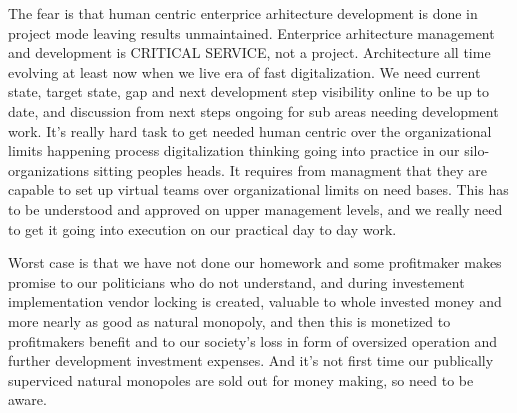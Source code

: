 The fear is that human centric enterprice arhitecture development is done in
project mode leaving results unmaintained. Enterprice arhitecture management
and development is CRITICAL SERVICE, not a project. Architecture all time
evolving at least now when we live era of fast digitalization. We need current
state, target state, gap and next development step visibility online to be up
to date, and discussion from next steps ongoing for sub areas needing
development work. It's really hard task to get needed human centric over the
organizational limits happening process digitalization thinking going into
practice in our silo-organizations sitting peoples heads. It requires from
managment that they are capable to set up virtual teams over organizational
limits on need bases. This has to be understood and approved on upper
management levels, and we really need to get it going into execution on our
practical day to day work.

Worst case is that we have not done our homework and some profitmaker makes
promise to our politicians who do not understand, and during investement
implementation vendor locking is created, valuable to whole invested money
and more nearly as good as natural monopoly, and then this is monetized to
profitmakers benefit and to our society's loss in form of oversized operation
and further development investment expenses. And it's not first time our
publically superviced natural monopoles are sold out for money making, so
need to be aware.

